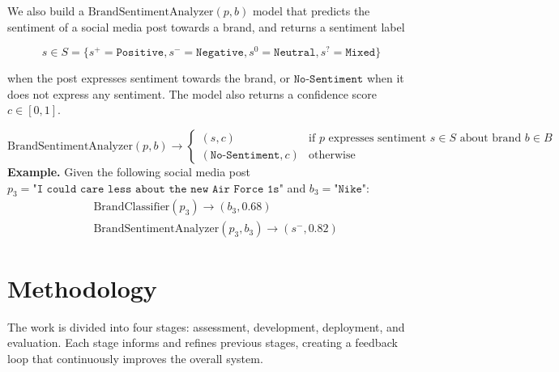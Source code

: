 \documentclass{article}
\begin{document}
We also build a $\mathrm{BrandSentimentAnalyzer}(p, b)$ model that predicts the
sentiment of a social media post towards a brand, and returns a sentiment label

\[
    s \in S =
    \{
    s^{+}=\texttt{Positive},
    s^{-}=\texttt{Negative},
    s^{0}=\texttt{Neutral},
    s^{?}=\texttt{Mixed}
    \}
\]

when the post expresses sentiment towards the brand, or $\texttt{No-Sentiment}$
when it does not express any sentiment. The model also returns a confidence
score $c \in [0, 1]$.

\[
    \mathrm{BrandSentimentAnalyzer}(p, b) \rightarrow \begin{cases}
        (s, c)                     & \text{if } p \text{ expresses sentiment }
        s \in S \text{ about brand } b \in B
        \\
        (\texttt{No-Sentiment}, c) & \text{otherwise}
    \end{cases}
\]
\textbf{Example.} Given the following social media post $p_3 = \texttt{"I could
        care less about the new Air Force 1s"}$ and $b_3 = \texttt{"Nike"}$:
\begin{align*}
     & \mathrm{BrandClassifier}(p_3) \rightarrow (b_3, 0.68)               \\
     & \mathrm{BrandSentimentAnalyzer}(p_3, b_3) \rightarrow (s^{-}, 0.82)
\end{align*}

\newpage

\section*{Methodology}

The work is divided into four stages: assessment, development, deployment, and
evaluation. Each stage informs and refines previous stages, creating a feedback
loop that continuously improves the overall system.
\end{document}
